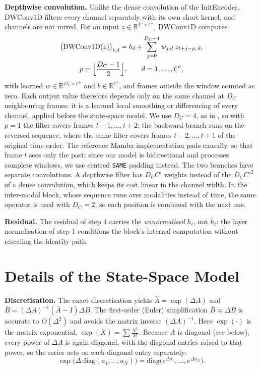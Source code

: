 \documentclass[10pt,a4paper,twocolumn]{article}
\newcommand{\R}{\mathbb{R}}
\begin{document}
	\textbf{Depthwise convolution.} Unlike the dense convolution of the InitEncoder, $\text{DWConv1D}$ filters every channel separately with its own short kernel, and channels are not mixed. For an input $z \in \R^{L' \times C'}$, $\text{DWConv1D}$ computes
		$$\begin{gathered}\bigl(\text{DWConv1D}(z)\bigr)_{t,d} = b_d + \sum_{j=0}^{D_C-1} w_{j,d}\; z_{t+j-p,\,d}, \\ p = \Bigl\lfloor \frac{D_C-1}{2} \Bigr\rfloor, \qquad d = 1,\dots,C',\end{gathered}$$
		with learned $w \in \R^{D_C \times C'}$ and $b \in \R^{C'}$, and frames outside the window counted as zero. Each output value therefore depends only on the same channel at $D_C$ neighbouring frames: it is a learned local smoothing or differencing of every channel, applied before the state-space model. We use $D_C = 4$, as in \cite{gu2023mamba}, so with $p = 1$ the filter covers frames $t-1, \dots, t+2$; the backward branch runs on the reversed sequence, where the same filter covers frames $t-2, \dots, t+1$ of the original time order. The reference Mamba implementation pads causally, so that frame $t$ sees only the past; since our model is bidirectional and processes complete windows, we use centred \texttt{SAME} padding instead. The two branches have separate convolutions. A depthwise filter has $D_C C'$ weights instead of the $D_C C'^2$ of a dense convolution, which keeps its cost linear in the channel width. In the inter-modal block, whose sequence runs over modalities instead of time, the same operator is used with $D_C = 2$, so each position is combined with the next one.

	\textbf{Residual.} The residual of step 4 carries the \emph{unnormalised} $h_i$, not $\bar{h}_i$: the layer normalisation of step 1 conditions the block's internal computation without rescaling the identity path.


	\section{Details of the State-Space Model}
	\label{app:ssm}
	\textbf{Discretisation.} The exact discretisation yields $\bar{A} = \exp(\Delta A)$ and $\bar{B} = (\Delta A)^{-1}(\bar{A} - I)\Delta B$. The first-order (Euler) simplification $\bar{B} \approx \Delta B$ is accurate to $O(\Delta^2)$ and avoids the matrix inverse $(\Delta A)^{-1}$. Here $\exp(\cdot)$ is the matrix exponential, $\exp(X) = \sum \frac{X^k}{k!}$. Because $A$ is diagonal (see below), every power of $\Delta A$ is again diagonal, with the diagonal entries raised to that power, so the series acts on each diagonal entry separately:
		$$\exp\bigl(\Delta\,\mathrm{diag}(a_1,\dots,a_N)\bigr) = \mathrm{diag}\bigl(e^{\Delta a_1}, \dots, e^{\Delta a_N}\bigr).$$
\end{document}

